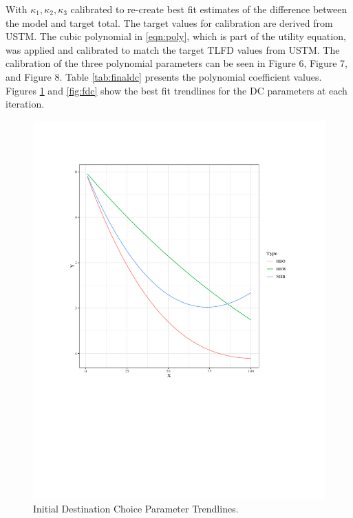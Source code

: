 With $\kappa_1,\kappa_2,\kappa_3$ calibrated to re-create best fit estimates of the difference between the model and target total. The target values for calibration are derived from USTM. The cubic polynomial in \ref{eqn:poly}, which is part of the utility equation, was applied and calibrated to match the target TLFD values from USTM. The calibration of the three polynomial parameters can be seen in Figure 6, Figure 7, and Figure 8. Table \ref{tab:finaldc} presents the polynomial coefficient values. Figures \ref{fig:ogdc} and \ref{fig:fdc} show the best fit trendlines for the DC parameters at each iteration.


 \begin{figure}

 {\centering \includegraphics[width=0.75\linewidth]{figures/chapter3/initial_DC.pdf}

 }

 \caption{Initial Destination Choice Parameter Trendlines.}\label{fig:ogdc}
 \end{figure}

